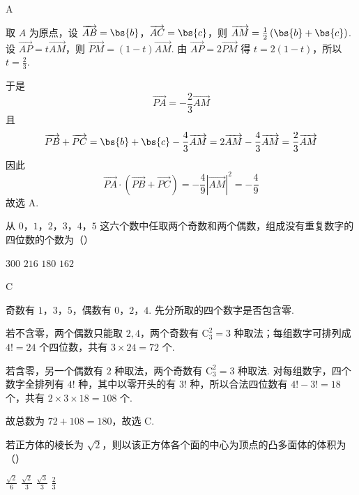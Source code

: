\begin{answer}
A
\end{answer}

\begin{solution}
取 \(A\) 为原点，设 \(\overrightarrow{AB}=\bs{b}\)，\(\overrightarrow{AC}=\bs{c}\)，则
\(\overrightarrow{AM}=\frac{1}{2}\left(\bs{b}+\bs{c}\right)\). 设
\(\overrightarrow{AP}=t\overrightarrow{AM}\)，则
\(\overrightarrow{PM}=\left(1-t\right)\overrightarrow{AM}\). 由
\(\overrightarrow{AP}=2\overrightarrow{PM}\) 得 \(t=2\left(1-t\right)\)，所以 \(t=\frac{2}{3}\).

于是
\[
\overrightarrow{PA}=-\frac{2}{3}\overrightarrow{AM}
\]
且
\[
\overrightarrow{PB}+\overrightarrow{PC}
=\bs{b}+\bs{c}-\frac{4}{3}\overrightarrow{AM}=2\overrightarrow{AM}-\frac{4}{3}\overrightarrow{AM}=\frac{2}{3}\overrightarrow{AM}
\]
因此
\[
\overrightarrow{PA}\cdot\left(\overrightarrow{PB}+\overrightarrow{PC}\right)
=-\frac{4}{9}|\overrightarrow{AM}|^{2}=-\frac{4}{9}
\]
故选 A.
\end{solution}

\begin{problem}
从 \(0\)，\(1\)，\(2\)，\(3\)，\(4\)，\(5\) 这六个数中任取两个奇数和两个偶数，组成没有重复数字的四位数的个数为（\quad）

\choices
    {\(300\)}
    {\(216\)}
    {\(180\)}
    {\(162\)}

\end{problem}

\begin{answer}
C
\end{answer}

\begin{solution}
奇数有 \(1\)，\(3\)，\(5\)，偶数有 \(0\)，\(2\)，\(4\). 先分所取的四个数字是否包含零.

若不含零，两个偶数只能取 \(2,4\)，两个奇数有 \(\mathrm C_{3}^{2}=3\) 种取法；每组数字可排列成 \(4!=24\) 个四位数，共有
\(3\times24=72\) 个.

若含零，另一个偶数有 \(2\) 种取法，两个奇数有 \(\mathrm C_{3}^{2}=3\) 种取法. 对每组数字，四个数字全排列有 \(4!\) 种，其中以零开头的有 \(3!\) 种，所以合法四位数有 \(4!-3!=18\) 个，共有
\(2\times3\times18=108\) 个.

故总数为 \(72+108=180\)，故选 C.
\end{solution}

\begin{problem}
若正方体的棱长为 \(\sqrt{2}\)，则以该正方体各个面的中心为顶点的凸多面体的体积为（\quad）

\choices
    {\(\frac{\sqrt{2}}{6}\)}
    {\(\frac{\sqrt{2}}{3}\)}
    {\(\frac{\sqrt{3}}{3}\)}
    {\(\frac{2}{3}\)}

\end{problem}

